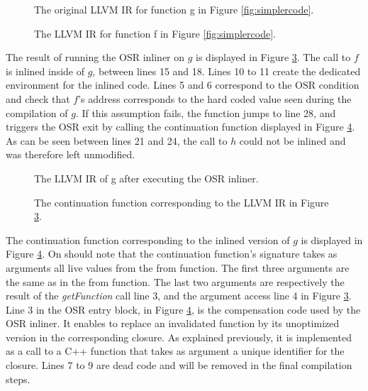 \begin{figure}[h!]
\centering
{}
\caption{The original LLVM IR for function g in Figure \ref{fig:simplercode}.}
\label{fig:originalouter}
\end{figure}

\begin{figure}[h!]
\centering
{}
\caption{The LLVM IR for function f in Figure \ref{fig:simplercode}.}
\label{fig:originalinner}
\end{figure}

The result of running the OSR inliner on $g$ is displayed in Figure \ref{fig:inlinedouter}.
The call to $f$ is inlined inside of $g$, between lines 15 and 18. 
Lines 10 to 11 create the dedicated environment for the inlined code.
Lines 5 and 6 correspond to the OSR condition and check that $f$'s address corresponds to the hard coded value seen during the compilation of $g$. 
If this assumption fails, the function jumps to line 28, and triggers the OSR exit by calling the continuation function displayed in Figure \ref{fig:continuationllvm}.
As can be seen between lines 21 and 24, the call to $h$ could not be inlined and was therefore left unmodified.\\

\begin{figure}[h!]
\centering
{}
\caption{The LLVM IR of g after executing the OSR inliner.}
\label{fig:inlinedouter}
\end{figure}

\begin{figure}[h!]
\centering
{}
\caption{The continuation function corresponding to the LLVM IR in Figure \ref{fig:inlinedouter}.}
\label{fig:continuationllvm}
\end{figure}

The continuation function corresponding to the inlined version of $g$ is displayed in Figure \ref{fig:continuationllvm}.
On should note that the continuation function's signature takes as arguments all live values from the from function.
The first three arguments are the same as in the from function.
The last two arguments are respectively the result of the \textit{getFunction} call line 3, and the argument access line 4 in Figure \ref{fig:inlinedouter}. 
Line 3 in the OSR entry block, in Figure \ref{fig:continuationllvm}, is the compensation code used by the OSR inliner.
It enables to replace an invalidated function by its unoptimized version in the corresponding closure. 
As explained previously, it is implemented as a call to a C++ function that takes as argument a unique identifier for the closure.
Lines 7 to 9 are dead code and will be removed in the final compilation steps.\\

